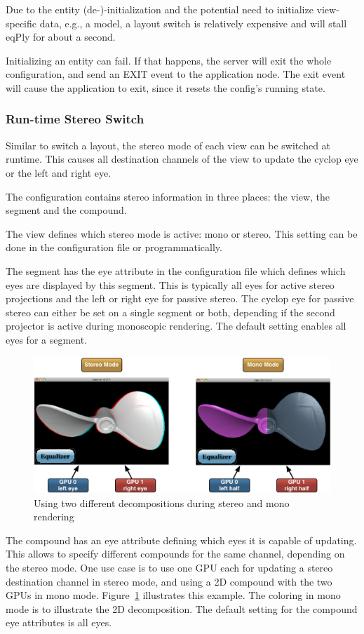 \documentclass[10pt,a4]{scrartcl}
\newcommand{\fig}[1]{Figure~\ref{#1}}
\begin{document}
Due to the entity (de-)-initialization and the potential need to
initialize view-specific data, e.g., a model, a layout switch is
relatively expensive and will stall \textsf{eqPly} for about a second.

Initializing an entity can fail. If that happens, the server will exit
the whole configuration, and send an \textsf{EXIT} event to the
application node. The exit event will cause the application to exit,
since it resets the config's running state.

\subsubsection{Run-time Stereo Switch}

Similar to switch a layout, the stereo mode of each view can be switched at
runtime. This causes all destination channels of the view to update the cyclop
eye or the left and right eye.

The configuration contains stereo information in three places: the view, the
segment and the compound.

The view defines which stereo mode is active: mono or stereo. This setting can
be done in the configuration file or programmatically.

The segment has the \textsf{eye} attribute in the configuration file which
defines which eyes are displayed by this segment. This is typically all eyes for
active stereo projections and the left or right eye for passive stereo. The
cyclop eye for passive stereo can either be set on a single segment or both,
depending if the second projector is active during monoscopic rendering. The
default setting enables all eyes for a segment.

\begin{figure}
  \includegraphics[width=.618\textwidth]{images/stereoSwitch.pdf}
  {\caption{\label{fStereoSwitch}Using two different decompositions during
      stereo and mono rendering}}
\end{figure}
The compound has an \textsf{eye} attribute defining which eyes it is capable of
updating. This allows to specify different compounds for the same channel,
depending on the stereo mode. One use case is to use one GPU each for updating a
stereo destination channel in stereo mode, and using a 2D compound with the two
GPUs in mono mode. \fig{fStereoSwitch} illustrates this example. The coloring in
mono mode is to illustrate the 2D decomposition. The default setting for the
compound eye attributes is all eyes.
\end{document}
